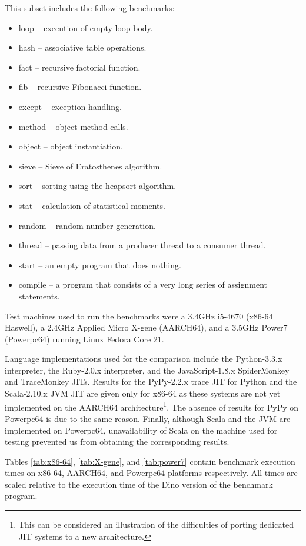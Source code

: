 \documentclass[preprint]{sigplanconf}
\begin{document}

This subset includes the following benchmarks:
\begin{itemize}
\item loop -- execution of empty loop body.
\item hash -- associative table operations.
\item fact -- recursive factorial function.
\item fib -- recursive Fibonacci function.
\item except -- exception handling.
\item method -- object method calls.
\item object -- object instantiation.
\item sieve -- Sieve of Eratosthenes algorithm.
\item sort -- sorting using the heapsort algorithm.
\item stat -- calculation of statistical moments.
\item random -- random number generation.
\item thread -- passing data from a producer thread to a consumer thread.
\item start -- an empty program that does nothing.
\item compile -- a program that consists of a very long series of assignment statements.
\end{itemize}

  Test machines used to run the benchmarks were a 3.4GHz i5-4670 (x86-64 Haswell),
a 2.4GHz Applied Micro X-gene (AARCH64), and a 3.5GHz Power7 (Powerpc64)
running Linux Fedora Core 21.

  Language implementations used for the comparison include
the Python-3.3.x interpreter,
the Ruby-2.0.x interpreter, and the JavaScript-1.8.x SpiderMonkey and TraceMonkey
JITs.  Results for the PyPy-2.2.x trace JIT for Python and the Scala-2.10.x
JVM JIT are given only for x86-64 as these systems are not yet implemented
on the AARCH64 architecture\footnote{This can be considered an illustration of the difficulties of porting dedicated JIT systems
to a new architecture.}.  The absence of results for PyPy on
Powerpc64 is due to the same reason.  Finally, although Scala and the JVM are
implemented on Powerpc64, unavailability of Scala on the
machine used for testing prevented us from obtaining the corresponding results.

  Tables \ref{tab:x86-64}, \ref{tab:X-gene}, and \ref{tab:power7}
contain benchmark execution times on x86-64,
AARCH64, and Powerpc64 platforms respectively.  All times are scaled relative to the execution time of the Dino version of the benchmark program.
\end{document}
